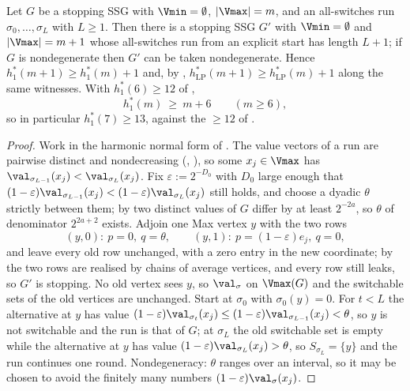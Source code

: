 \begin{theorem}\label{hkd:one-plus-one}
Let $G$ be a stopping SSG with $\Vmin=\emptyset$, $|\Vmax|=m$, and an
all-switches run $\sigma_0,\dots,\sigma_L$ with $L\ge1$. Then there is a
stopping SSG $G'$ with $\Vmin=\emptyset$ and $|\Vmax|=m+1$ whose
all-switches run from an explicit start has length $L+1$; if $G$ is
nondegenerate then $G'$ can be taken nondegenerate. Hence
$h^{\ast}_{1}(m+1)\ge h^{\ast}_{1}(m)+1$ and, by
, $h^{\ast}_{\mathrm{LP}}(m+1)\ge
h^{\ast}_{\mathrm{LP}}(m)+1$ along the same witnesses. With
$h^{\ast}_{1}(6)\ge12$ of ,
\[
  h^{\ast}_{1}(m)\ \ge\ m+6\qquad(m\ge6),
\]
so in particular $h^{\ast}_{1}(7)\ge13$, against the $\ge12$ of
.
\end{theorem}

\begin{proof}
Work in the harmonic normal form of . The value
vectors of a run are pairwise distinct and nondecreasing
(, ), so some $x_j\in\Vmax$ has
$\val_{\sigma_{L-1}}(x_j)<\val_{\sigma_L}(x_j)$. Fix
$\varepsilon:=2^{-D_0}$ with $D_0$ large enough that
$(1-\varepsilon)\val_{\sigma_{L-1}}(x_j)<(1-\varepsilon)\val_{\sigma_L}(x_j)$
still holds, and choose a dyadic $\theta$ strictly between them; by
 two distinct values of $G$ differ by at least
$2^{-2a}$, so $\theta$ of denominator $2^{2a+2}$ exists. Adjoin one Max
vertex $y$ with the two rows
\[
  (y,0):\ p=0,\ q=\theta,\qquad (y,1):\ p=(1-\varepsilon)e_j,\ q=0,
\]
and leave every old row unchanged, with a zero entry in the new
coordinate; by  the two rows are realised by chains
of average vertices, and every row still leaks, so $G'$ is stopping. No
old vertex sees $y$, so $\val_\sigma$ on $\Vmax(G)$ and the switchable
sets of the old vertices are unchanged. Start at $\sigma_0$ with
$\sigma_0(y)=0$. For $t<L$ the alternative at $y$ has value
$(1-\varepsilon)\val_{\sigma_t}(x_j)\le
(1-\varepsilon)\val_{\sigma_{L-1}}(x_j)<\theta$, so $y$ is not switchable
and the run is that of $G$; at $\sigma_L$ the old switchable set is empty
while the alternative at $y$ has value
$(1-\varepsilon)\val_{\sigma_L}(x_j)>\theta$, so $S_{\sigma_L}=\{y\}$ and
the run continues one round. Nondegeneracy: $\theta$ ranges over an
interval, so it may be chosen to avoid the finitely many numbers
$(1-\varepsilon)\val_\sigma(x_j)$.
\end{proof}

